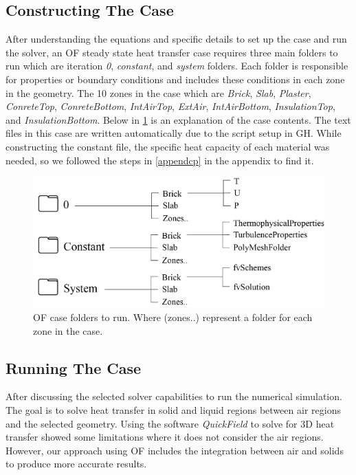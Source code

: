 \subsection{Constructing The Case}    
After understanding the equations and specific details to set up the case and run the solver, an \gls{OF} steady state heat transfer case requires three main folders to run which are iteration \textit{0}, \textit{constant}, and \textit{system} folders. Each folder is responsible for properties or boundary conditions and includes these conditions in each zone in the geometry. The 10 zones in the case which are \textit{Brick}, \textit{Slab}, \textit{Plaster}, \textit{ConreteTop}, \textit{ConreteBottom}, \textit{IntAirTop}, \textit{ExtAir}, \textit{IntAirBottom}, \textit{InsulationTop}, and \textit{InsulationBottom}. Below in \cref{constc} is an explanation of the case contents. The text files in this case are written automatically due to the script setup in \gls{GH}. While constructing the constant file, the specific heat capacity of each material was needed, so we followed the steps in \ref{appendcp} in the appendix to find it.






\begin{figure}[H]
\centering
\includegraphics[width=0.77\columnwidth]{Figures/constc.png}
\hspace{0.7cm}
\caption[OF Case Contents]{OF case folders to run. Where (zones..) represent a folder for each zone in the case.}
\label{constc}
\end{figure}





\subsection{Running The Case}    
 
After discussing the selected solver capabilities to run the numerical simulation. The goal is to solve heat transfer in solid and liquid regions between air regions and the selected geometry. Using the software \textit{QuickField}  to solve for 3D heat transfer showed some limitations where it does not consider the air regions. However, our approach using  \gls{OF} includes the integration between air and solids to produce more accurate results. 

